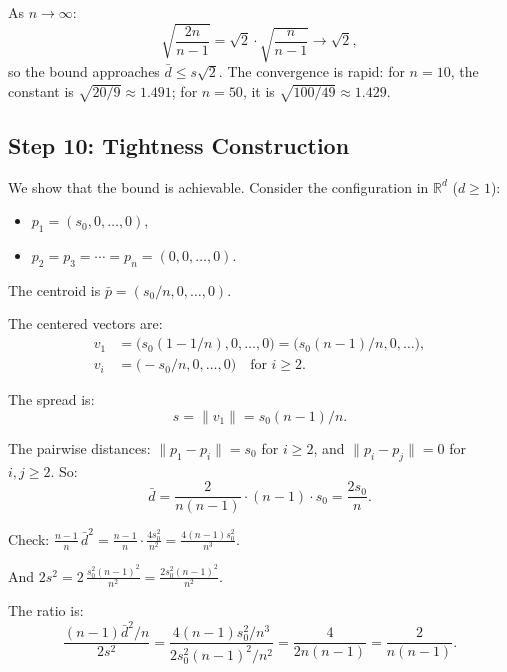\documentclass[11pt,a4paper]{article}
\newcommand{\R}{\mathbb{R}}
\begin{document}
As $n \to \infty$:
\begin{equation}
  \sqrt{\frac{2n}{n-1}} = \sqrt{2}\cdot\sqrt{\frac{n}{n-1}}
  \to \sqrt{2},
\end{equation}
so the bound approaches $\bar{d} \leq s\sqrt{2}$.
The convergence is rapid: for $n = 10$, the constant is
$\sqrt{20/9} \approx 1.491$; for $n = 50$, it is
$\sqrt{100/49} \approx 1.429$.

\subsection{Step 10: Tightness Construction}

We show that the bound is achievable.  Consider the
configuration in $\R^d$ ($d \geq 1$):
\begin{itemize}[leftmargin=2em]
\item $p_1 = (s_0, 0, \ldots, 0)$,
\item $p_2 = p_3 = \cdots = p_n = (0, 0, \ldots, 0)$.
\end{itemize}

The centroid is $\bar{p} = (s_0/n, 0, \ldots, 0)$.

The centered vectors are:
\begin{align}
  v_1 &= \bigl(s_0(1 - 1/n), 0, \ldots, 0\bigr)
       = \bigl(s_0(n-1)/n, 0, \ldots\bigr), \\
  v_i &= \bigl(-s_0/n, 0, \ldots, 0\bigr)
       \quad\text{for } i \geq 2.
\end{align}

The spread is:
\begin{equation}
  s = \|v_1\| = s_0(n-1)/n.
\end{equation}

The pairwise distances: $\|p_1 - p_i\| = s_0$ for $i \geq 2$,
and $\|p_i - p_j\| = 0$ for $i, j \geq 2$.  So:
\begin{equation}
  \bar{d} = \frac{2}{n(n-1)} \cdot (n-1) \cdot s_0
          = \frac{2s_0}{n}.
\end{equation}

Check: $\frac{n-1}{n}\,\bar{d}^2 = \frac{n-1}{n}\cdot
\frac{4s_0^2}{n^2} = \frac{4(n-1)s_0^2}{n^3}$.

And $2s^2 = 2\,\frac{s_0^2(n-1)^2}{n^2} =
\frac{2s_0^2(n-1)^2}{n^2}$.

The ratio is:
\begin{equation}
  \frac{(n-1)\bar{d}^2/n}{2s^2}
  = \frac{4(n-1)s_0^2/n^3}{2s_0^2(n-1)^2/n^2}
  = \frac{4}{2n(n-1)} = \frac{2}{n(n-1)}.
\end{equation}
\end{document}
